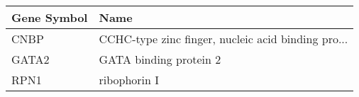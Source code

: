 \begin{tabular}{ll}
\toprule
Gene Symbol &                                               Name \\
\midrule
       CNBP & CCHC-type zinc finger, nucleic acid binding pro... \\
      GATA2 &                             GATA binding protein 2 \\
       RPN1 &                                       ribophorin I \\
\bottomrule
\end{tabular}
